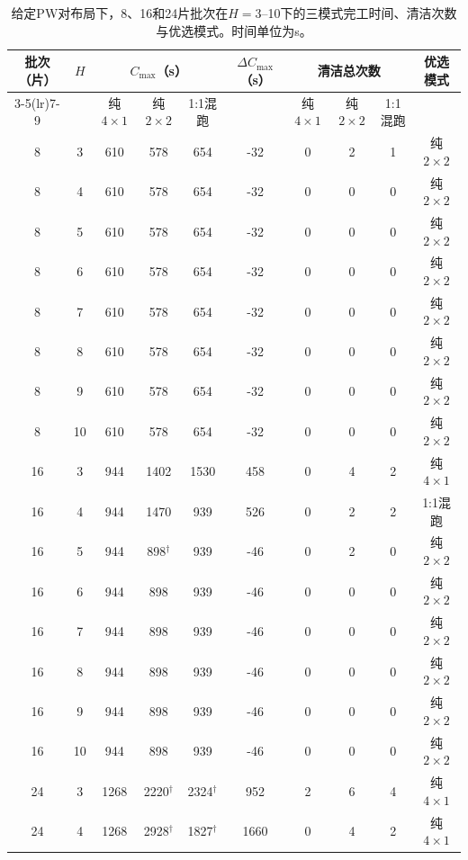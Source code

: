 \documentclass[journal]{IEEEtran}
\begin{document}
\begin{table}[tp]
\centering
\footnotesize
\setlength{\tabcolsep}{3pt}
\caption{给定PW对布局下，8、16和24片批次在$H=3$--10下的三模式完工时间、清洁次数与优选模式。时间单位为s。}
\label{tab:clean-crossover-zh}
\begin{tabular}{cccccccccc}
\toprule
\multirow{2}{*}{批次（片）} & \multirow{2}{*}{$H$} & \multicolumn{3}{c}{$C_{\max}$（s）} & \multirow{2}{*}{$\Delta C_{\max}$（s）} & \multicolumn{3}{c}{清洁总次数} & \multirow{2}{*}{优选模式}\\
\cmidrule(lr){3-5}\cmidrule(lr){7-9}
 & & 纯$4\times1$ & 纯$2\times2$ & 1:1混跑 & & 纯$4\times1$ & 纯$2\times2$ & 1:1混跑 & \\
\midrule
8 & 3 & 610 & 578 & 654 & -32 & 0 & 2 & 1 & 纯$2\times2$\\
8 & 4 & 610 & 578 & 654 & -32 & 0 & 0 & 0 & 纯$2\times2$\\
8 & 5 & 610 & 578 & 654 & -32 & 0 & 0 & 0 & 纯$2\times2$\\
8 & 6 & 610 & 578 & 654 & -32 & 0 & 0 & 0 & 纯$2\times2$\\
8 & 7 & 610 & 578 & 654 & -32 & 0 & 0 & 0 & 纯$2\times2$\\
8 & 8 & 610 & 578 & 654 & -32 & 0 & 0 & 0 & 纯$2\times2$\\
8 & 9 & 610 & 578 & 654 & -32 & 0 & 0 & 0 & 纯$2\times2$\\
8 & 10 & 610 & 578 & 654 & -32 & 0 & 0 & 0 & 纯$2\times2$\\
\midrule
16 & 3 & 944 & 1402 & 1530 & 458 & 0 & 4 & 2 & 纯$4\times1$\\
16 & 4 & 944 & 1470 & 939 & 526 & 0 & 2 & 2 & 1:1混跑\\
16 & 5 & 944 & 898$^{\dagger}$ & 939 & -46 & 0 & 2 & 0 & 纯$2\times2$\\
16 & 6 & 944 & 898 & 939 & -46 & 0 & 0 & 0 & 纯$2\times2$\\
16 & 7 & 944 & 898 & 939 & -46 & 0 & 0 & 0 & 纯$2\times2$\\
16 & 8 & 944 & 898 & 939 & -46 & 0 & 0 & 0 & 纯$2\times2$\\
16 & 9 & 944 & 898 & 939 & -46 & 0 & 0 & 0 & 纯$2\times2$\\
16 & 10 & 944 & 898 & 939 & -46 & 0 & 0 & 0 & 纯$2\times2$\\
\midrule
24 & 3 & 1268 & 2220$^{\dagger}$ & 2324$^{\dagger}$ & 952 & 2 & 6 & 4 & 纯$4\times1$\\
24 & 4 & 1268 & 2928$^{\dagger}$ & 1827$^{\dagger}$ & 1660 & 0 & 4 & 2 & 纯$4\times1$\\

\end{tabular}
\end{table}
\end{document}
